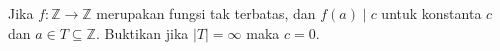 Jika $f : \mathbb{Z} \to \mathbb{Z}$ merupakan fungsi tak terbatas, dan $f(a) \mid c$ untuk konstanta $c$ dan $a \in T \subseteq \mathbb{Z}$. Buktikan jika $|T| = \infty$ maka $c = 0$.